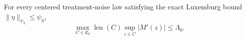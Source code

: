 For every centered treatment-noise law satisfying the exact Luxemburg bound \(\|\eta\|_{\psi_2}\le\psi_\eta\),
\[
 \max_{C\in\mathfrak C_0}\operatorname{len}(C)
 \sup_{z\in C}|M'(z)|\le\Lambda_0.
\]